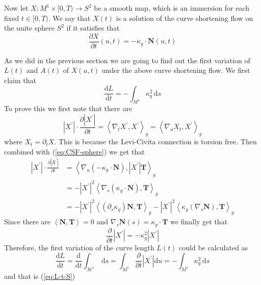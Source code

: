 Now let $X:M^1\times[0,T)\to S^2$ be a smooth map, which is an immersion for each fixed $t\in[0,T)$. We say that $X(t)$ is a solution of the curve shortening flow on the unite sphere $S^2$ if it satisfies that
\begin{equation}\label{eq:CSF-sphere}
    \frac{\partial X}{\partial t}(u,t)=-\kappa_g\cdot\mathbf{N}(u,t)
\end{equation}

As we did in the previous section we are going to find out the first variation of $L(t)$ and $A(t)$ of $X(u,t)$ under the above curve shortening flow. We first claim that
\begin{equation}\label{eq:L-t-S}
    \frac{\mathrm{d}L}{\mathrm{d}t}=-\int_{M^1}\kappa^2_g\,\mathrm{d}s
\end{equation}
To prove this we first note that there are
\begin{equation*}
    \left|X^\prime\right|\cdot\frac{\partial\left|X^\prime\right|}{\partial t}={\left<\nabla_t X^\prime, X^\prime\right>}_g={\left<\nabla_u X_t, X^\prime\right>}_g
\end{equation*}
where $X_t=\partial_t X$. This is because the Levi-Civita connection is torsion free. Then combined with (\ref{eq:CSF-sphere}) we get that
\begin{align*}
    \left|X^\prime\right|\cdot\frac{\partial\left|X^\prime\right|}{\partial t}&={\left<\nabla_u\left(-\kappa_g\cdot\mathbf{N}\right),\left|X^\prime\right|\mathbf{T}\right>}_g\\
    &=-{\left|X^\prime\right|}^2{\left<\nabla_s\left(\kappa_g\cdot\mathbf{N}\right),\mathbf{T}\right>}_g\\
    &=-{\left|X^\prime\right|}^2{\left<(\partial_s\kappa_g)\mathbf{N},\mathbf{T}\right>}_g-{\left|X^\prime\right|}^2{\left<\kappa_g\left(\nabla_s\mathbf{N}\right),\mathbf{T}\right>}_g
\end{align*}
Since there are $\left<\mathbf{N},\mathbf{T}\right>=0$ and $\nabla_s \mathbf{N}(s)=\kappa_g\cdot\mathbf{T}$ we finally get that
\begin{equation*}
    \frac{\partial}{\partial t}\left|X^\prime\right|=-\kappa^2_g\left|X^\prime\right|
\end{equation*}
Therefore, the first variation of the curve length $L(t)$ could be calculated as
\begin{equation*}
    \frac{\mathrm{d}L}{\mathrm{d}t}=\frac{\mathrm{d}}{\mathrm{d}t}\int_{\mathcal{M}^1}\,\mathrm{d}s=\int_{M^1}\frac{\partial}{\partial t}\left|X^\prime\right|\mathrm{d}u=-\int_{M^1}\kappa^2_g\,\mathrm{d}s
\end{equation*}
and that is (\ref{eq:L-t-S})